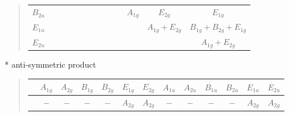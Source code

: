 \documentclass[fleqn,8pt,landscape]{jsarticle}
\begin{document}
\begin{quote}
\begin{tabular}{c|cccccccccccc}
$ B_{2u} $ & $  $ & $  $ & $  $ & $  $ & $  $ & $  $ & $  $ & $  $ & $  $ & $ A_{1g} $ & $ E_{2g} $ & $ E_{1g} $ \\
$ E_{1u} $ & $  $ & $  $ & $  $ & $  $ & $  $ & $  $ & $  $ & $  $ & $  $ & $  $ & $ A_{1g} + E_{2g} $ & $ B_{1g} + B_{2g} + E_{1g} $ \\
$ E_{2u} $ & $  $ & $  $ & $  $ & $  $ & $  $ & $  $ & $  $ & $  $ & $  $ & $  $ & $  $ & $ A_{1g} + E_{2g} $ \\
 \hline \hline
\end{tabular}
\end{quote}

* anti-symmetric product
\begin{quote}
\begin{tabular}{ccccccccccccc} \hline \hline
 & $ A_{1g} $ & $ A_{2g} $ & $ B_{1g} $ & $ B_{2g} $ & $ E_{1g} $ & $ E_{2g} $ & $ A_{1u} $ & $ A_{2u} $ & $ B_{1u} $ & $ B_{2u} $ & $ E_{1u} $ & $ E_{2u} $ \\ \hline
$  $ & $ - $ & $ - $ & $ - $ & $ - $ & $ A_{2g} $ & $ A_{2g} $ & $ - $ & $ - $ & $ - $ & $ - $ & $ A_{2g} $ & $ A_{2g} $ \\
 \hline \hline
\end{tabular}
\end{quote}
\end{document}

